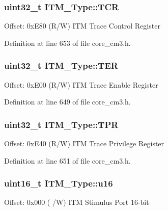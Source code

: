 \subsubsection[{\texorpdfstring{T\+CR}{TCR}}]{ uint32\+\_\+t I\+T\+M\+\_\+\+Type\+::\+T\+CR}\hypertarget{structITM__Type_a58f169e1aa40a9b8afb6296677c3bb45}{}\label{structITM__Type_a58f169e1aa40a9b8afb6296677c3bb45}
Offset\+: 0x\+E80 (R/W) I\+TM Trace Control Register 

Definition at line 653 of file core\+\_\+cm3.\+h.

\subsubsection[{\texorpdfstring{T\+ER}{TER}}]{ uint32\+\_\+t I\+T\+M\+\_\+\+Type\+::\+T\+ER}\hypertarget{structITM__Type_a91a040e1b162e1128ac1e852b4a0e589}{}\label{structITM__Type_a91a040e1b162e1128ac1e852b4a0e589}
Offset\+: 0x\+E00 (R/W) I\+TM Trace Enable Register 

Definition at line 649 of file core\+\_\+cm3.\+h.

\subsubsection[{\texorpdfstring{T\+PR}{TPR}}]{ uint32\+\_\+t I\+T\+M\+\_\+\+Type\+::\+T\+PR}\hypertarget{structITM__Type_a93b480aac6da620bbb611212186d47fa}{}\label{structITM__Type_a93b480aac6da620bbb611212186d47fa}
Offset\+: 0x\+E40 (R/W) I\+TM Trace Privilege Register 

Definition at line 651 of file core\+\_\+cm3.\+h.

\subsubsection[{\texorpdfstring{u16}{u16}}]{ uint16\+\_\+t I\+T\+M\+\_\+\+Type\+::u16}\hypertarget{structITM__Type_a12aa4eb4d9dcb589a5d953c836f4e8f4}{}\label{structITM__Type_a12aa4eb4d9dcb589a5d953c836f4e8f4}
Offset\+: 0x000 ( /W) I\+TM Stimulus Port 16-\/bit 

